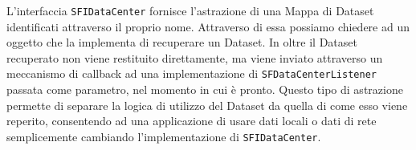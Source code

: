 L'interfaccia \texttt{SFIDataCenter} fornisce l'astrazione di una Mappa di Dataset identificati attraverso il proprio nome. Attraverso di essa possiamo chiedere ad un oggetto che la implementa di recuperare un Dataset. In oltre il Dataset recuperato non viene restituito direttamente, ma viene inviato attraverso un meccanismo di callback ad una implementazione di \texttt{SFDataCenterListener} passata come parametro, nel momento in cui \`e pronto. Questo tipo di astrazione permette di separare la logica di utilizzo del Dataset da quella di come esso viene reperito, consentendo ad una applicazione di usare dati locali o dati di rete semplicemente cambiando l'implementazione di \texttt{SFIDataCenter}.
